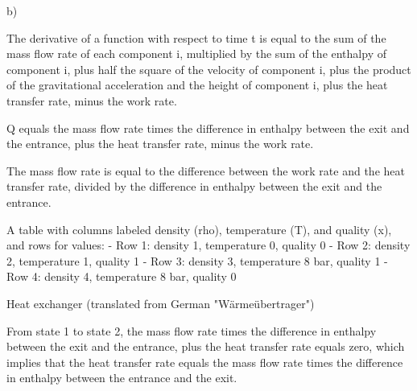 b)

The derivative of a function with respect to time t is equal to the sum of the mass flow rate of each component i, multiplied by the sum of the enthalpy of component i, plus half the square of the velocity of component i, plus the product of the gravitational acceleration and the height of component i, plus the heat transfer rate, minus the work rate.

Q equals the mass flow rate times the difference in enthalpy between the exit and the entrance, plus the heat transfer rate, minus the work rate.

The mass flow rate is equal to the difference between the work rate and the heat transfer rate, divided by the difference in enthalpy between the exit and the entrance.

A table with columns labeled density (rho), temperature (T), and quality (x), and rows for values:
- Row 1: density 1, temperature 0, quality 0
- Row 2: density 2, temperature 1, quality 1
- Row 3: density 3, temperature 8 bar, quality 1
- Row 4: density 4, temperature 8 bar, quality 0

Heat exchanger (translated from German "Wärmeübertrager")

From state 1 to state 2, the mass flow rate times the difference in enthalpy between the exit and the entrance, plus the heat transfer rate equals zero, which implies that the heat transfer rate equals the mass flow rate times the difference in enthalpy between the entrance and the exit.